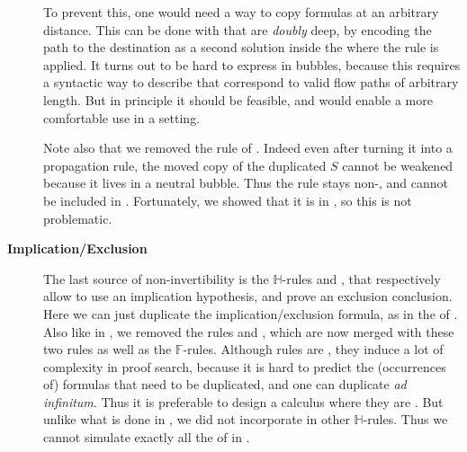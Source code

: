 \begin{description}
    To prevent this, one would need a way to copy formulas at an arbitrary
    distance. This can be done with  that are \emph{doubly} deep,
    by encoding the path to the destination as a second solution  inside
    the  where the rule is applied. It turns out
    to be hard to express in bubbles, because this requires a syntactic way to
    describe  that correspond to valid flow paths of arbitrary
    length. But in
    principle it should be feasible, and would enable a more comfortable use in
    a  setting.

    Note also that we removed the  rule of .
    Indeed even after turning it into a propagation rule, the moved copy of the
    duplicated  $S$ cannot be weakened because it lives in a neutral
    bubble. Thus the rule stays non-, and cannot be included in
    . Fortunately, we showed that it is  in
    , so this is not problematic.

  \item[\textbf{Implication/Exclusion}]
    The last source of non-invertibility is the $\mathbb{H}$-rules
    \rsf{{\limp}{-}} and \rsf{{\lsub}{+}}, that respectively allow to use an
    implication hypothesis, and prove an exclusion conclusion.
    Here we can just duplicate the implication/exclusion formula, as in the
     of . Also like in , we removed
    the  rules  and , which are now merged with
    these two rules as well as the $\mathbb{F}$-rules. Although 
    rules are , they induce a lot of complexity in proof search,
    because it is hard to predict the (occurrences of) formulas that need to be
    duplicated, and one can duplicate \emph{ad infinitum}. Thus it is preferable
    to design a calculus where they are . But unlike what is done in
    , we did not incorporate  in other
    $\mathbb{H}$-rules. Thus we cannot simulate exactly all the  of  in .

\end{description}

